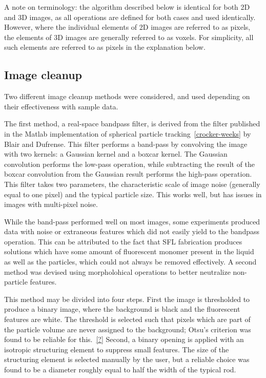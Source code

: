 A note on terminology: the algorithm described below is identical for both 2D and 3D images, as all
operations are defined for both cases and used identically. However, where the individual elements of
2D images are referred to as pixels, the elements of 3D images are generally referred to as voxels.
For simplicity, all such elements are referred to as pixels in the explanation below.

\subsection{Image cleanup}

Two different image cleanup methods were considered, and used depending on their effectiveness with
sample data.

The first method, a real-space bandpass filter, is derived from the filter published in the 
Matlab implementation of spherical particle tracking~\ref{crocker-weeks} by Blair and
Dufrense. This filter performs a band-pass by convolving the image with two kernels: 
a Gaussian kernel and a boxcar kernel.  The Gaussian convolution performs the low-pass
operation, while subtracting the result of the boxcar convolution from the Gaussian result
performs the high-pass operation. This filter takes two parameters, the characteristic scale
of image noise (generally equal to one pixel) and the typical particle size.  This works well,
but has issues in images with multi-pixel noise.

While the band-pass performed well on most images, some experiments produced data with noise or
extraneous features which did
not easily yield to the bandpass operation. This can be attributed to the fact that SFL fabrication produces
solutions which have some amount of fluorescent monomer present in the liquid as well as the particles, which
could not always be removed effectively.  A second method was devised using morpholohical
operations to better neutralize non-particle features.

This method may be divided into four steps. First the image is thresholded to produce a binary image, where the 
background is black and the fluorescent features are white. The threshold is selected such that pixels which 
are part of the particle volume are never assigned to the background; Otsu's criterion was found to be reliable
for this.~\ref{?}  Second, a binary opening is applied with an isotropic structuring element to
suppress small features. The size of the structuring element is selected manually by the user, but a 
reliable choice was found to be a diameter roughly equal to half the width of the typical rod. 

